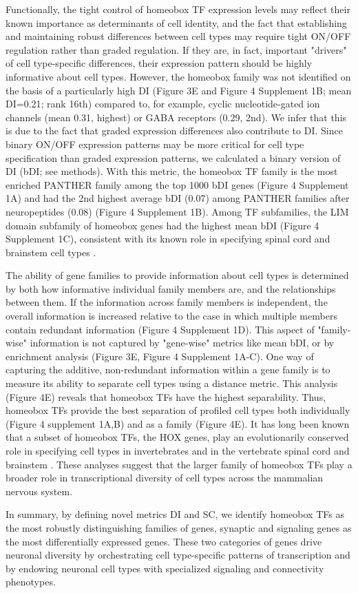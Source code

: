 Functionally, the tight control of homeobox TF expression levels may reflect their known importance as determinants of cell identity, and the fact that establishing and maintaining robust differences between cell types may require tight ON/OFF regulation rather than graded regulation. If they are, in fact, important "drivers" of cell type-specific differences, their expression pattern should be highly informative about cell types. However, the homeobox family was not identified on the basis of a particularly high DI (Figure 3E and Figure 4 Supplement 1B; mean DI=0.21; rank 16th) compared to, for example, cyclic nucleotide-gated ion channels (mean 0.31, highest) or GABA receptors (0.29, 2nd). We infer that this is due to the fact that graded expression differences also contribute to DI. Since binary ON/OFF expression patterns may be more critical for cell type specification than graded expression patterns, we calculated a binary version of DI (bDI; see methods). With this metric, the homeobox TF family is the most enriched PANTHER family among the top 1000 bDI genes (Figure 4 Supplement 1A) and had the 2nd highest average bDI (0.07) among PANTHER families after neuropeptides (0.08) (Figure 4 Supplement 1B). Among TF subfamilies, the LIM domain subfamily of homeobox genes had the highest mean bDI (Figure 4 Supplement 1C), consistent with its known role in specifying spinal cord and brainstem cell types \citep{Dasen_2009,Philippidou_2013}. 

The ability of gene families to provide information about cell types is determined by both how informative individual family members are, and the relationships between them. If the information across family members is independent, the overall information is increased relative to the case in which multiple members contain redundant information (Figure 4 Supplement 1D). This aspect of "family-wise" information is not captured by "gene-wise" metrics like mean bDI, or by enrichment analysis (Figure 3E, Figure 4 Supplement 1A-C). One way of capturing the additive, non-redundant information within a gene family is to measure its ability to separate cell types using a distance metric. This analysis (Figure 4E) reveals that homeobox TFs have the highest separability. Thus, homeobox TFs provide the best separation of profiled cell types both individually (Figure 4 supplement 1A,B) and as a family (Figure 4E). It has long been known that a subset of homeobox TFs, the HOX genes, play an evolutionarily conserved role in specifying cell types in invertebrates \citep{Kratsios_2017,Zheng_2015} and in the vertebrate spinal cord and brainstem \citep{Dasen_2009,Philippidou_2013}. These analyses suggest that the larger family of homeobox TFs play a broader role in transcriptional diversity of cell types across the mammalian nervous system.

In summary, by defining novel metrics DI and SC, we identify homeobox TFs as the most robustly distinguishing families of genes, synaptic and signaling genes as the most differentially expressed genes. These two categories of genes drive neuronal diversity by orchestrating cell type-specific patterns of transcription and by endowing neuronal cell types with specialized signaling and connectivity phenotypes.



